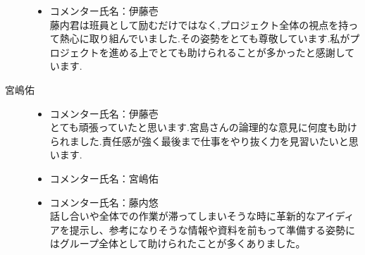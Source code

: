 \begin{description}
\begin{itemize}
  \item  コメンター氏名：伊藤壱\\
  藤内君は班員として励むだけではなく,プロジェクト全体の視点を持って熱心に取り組んでいました.その姿勢をとても尊敬しています.私がプロジェクトを進める上でとても助けられることが多かったと感謝しています.
      \end{itemize}
         \item[宮嶋佑]\mbox{}
      \begin{itemize}
      \item コメンター氏名：伊藤壱\\
   とても頑張っていたと思います.宮島さんの論理的な意見に何度も助けられました.責任感が強く最後まで仕事をやり抜く力を見習いたいと思います.
        \item コメンター氏名：宮嶋佑\\
        \item コメンター氏名：藤内悠\\話し合いや全体での作業が滞ってしまいそうな時に革新的なアイディアを提示し、参考になりそうな情報や資料を前もって準備する姿勢にはグループ全体として助けられたことが多くありました。
      \end{itemize}
\end{description}
